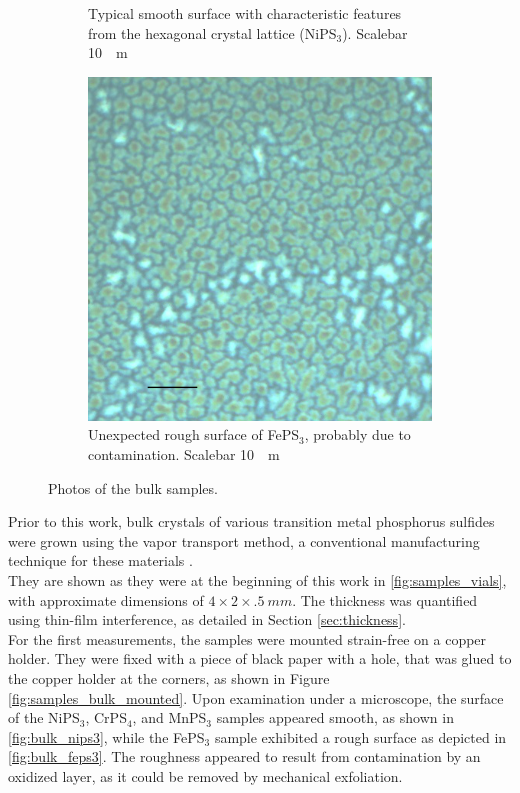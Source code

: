 \documentclass[
	twoside,
	parskip=half,
	a4paper,
]{scrbook}
\begin{document}
\begin{figure}
\begin{subfigure}[t]{.24\textwidth}
		\caption{Typical smooth surface with characteristic features from the hexagonal crystal lattice (NiPS$_3$). Scalebar \SI{10}{\mu m}}
		\label{fig:bulk_nips3}
	\end{subfigure}
	\begin{subfigure}[t]{.24\textwidth}
		\vskip 0pt
		\includegraphics[width=\textwidth]{../../data/2023-11-02/i009_FePS3_100x-scalebar.png}
		\caption{Unexpected rough surface of FePS$_3$, probably due to contamination.  Scalebar \SI{10}{\mu m}}
		\label{fig:bulk_feps3}
	\end{subfigure}
	\caption{Photos of the bulk samples.}
\end{figure}

Prior to this work, bulk crystals of various transition metal phosphorus sulfides were grown using the vapor transport method, a conventional manufacturing technique for these materials \cite{MPX_review, AFM_review}.\\
They are shown as they were at the beginning of this work in \autoref{fig:samples_vials}, with approximate dimensions of $4 \times 2 \times \SI{.5}{mm}$.
The thickness was quantified using thin-film interference, as detailed in Section \ref{sec:thickness}.\\
For the first measurements, the samples were mounted strain-free on a copper holder.
They were fixed with a piece of black paper with a hole, that was glued to the copper holder at the corners, as shown in Figure \autoref{fig:samples_bulk_mounted}.
Upon examination under a microscope, the surface of the NiPS$_3$, CrPS$_4$, and MnPS$_3$ samples appeared smooth, as shown in \autoref{fig:bulk_nips3}, while the FePS$_3$ sample exhibited a rough surface as depicted in \autoref{fig:bulk_feps3}.
The roughness appeared to result from contamination by an oxidized layer, as it could be removed by mechanical exfoliation.
\end{document}
